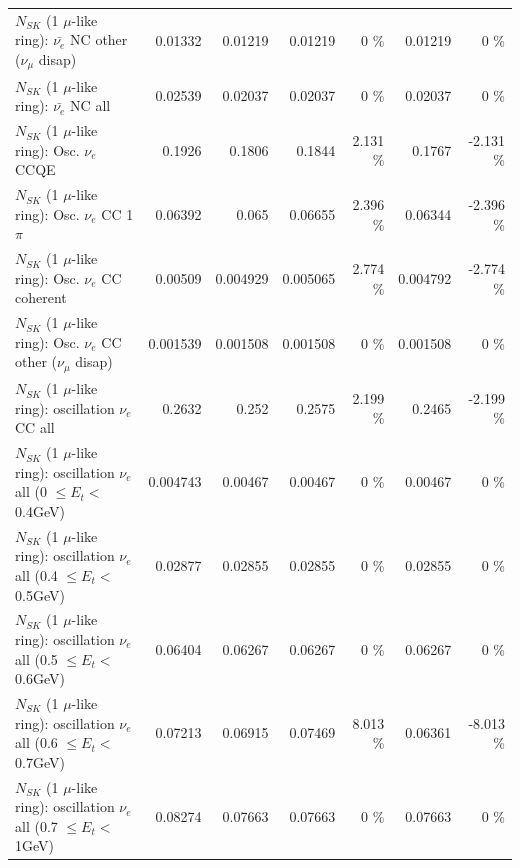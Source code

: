 \begin{table}
\begin{tabular}{| l | r | r | r  r | r  r |}
          $N_{SK}$ (1 $\mu$-like ring): $\bar{\nu_e}$ NC other ($\nu_\mu$ disap) &         0.01332 &         0.01219 &         0.01219 &        0 \%  &         0.01219 &        0 \%  \\ 
                            $N_{SK}$ (1 $\mu$-like ring): $\bar{\nu_{e}}$ NC all &         0.02539 &         0.02037 &         0.02037 &        0 \%  &         0.02037 &        0 \%  \\ 
\hline
\hline
\hline
                                 $N_{SK}$ (1 $\mu$-like ring): Osc. $\nu_e$ CCQE &          0.1926 &          0.1806 &          0.1844 &    2.131 \%  &          0.1767 &   -2.131 \%  \\ 
                            $N_{SK}$ (1 $\mu$-like ring): Osc. $\nu_e$ CC 1$\pi$ &         0.06392 &           0.065 &         0.06655 &    2.396 \%  &         0.06344 &   -2.396 \%  \\ 
                          $N_{SK}$ (1 $\mu$-like ring): Osc. $\nu_e$ CC coherent &         0.00509 &        0.004929 &        0.005065 &    2.774 \%  &        0.004792 &   -2.774 \%  \\ 
           $N_{SK}$ (1 $\mu$-like ring): Osc. $\nu_e$ CC other ($\nu_\mu$ disap) &        0.001539 &        0.001508 &        0.001508 &        0 \%  &        0.001508 &        0 \%  \\ 
                        $N_{SK}$ (1 $\mu$-like ring): oscillation $\nu_e$ CC all &          0.2632 &           0.252 &          0.2575 &    2.199 \%  &          0.2465 &   -2.199 \%  \\ 
\hline
$N_{SK}$ (1 $\mu$-like ring): oscillation $\nu_{e}$ all (0 $\leq E_{t} <$ 0.4GeV) &        0.004743 &         0.00467 &         0.00467 &        0 \%  &         0.00467 &        0 \%  \\ 
$N_{SK}$ (1 $\mu$-like ring): oscillation $\nu_{e}$ all (0.4 $\leq E_{t} <$ 0.5GeV) &         0.02877 &         0.02855 &         0.02855 &        0 \%  &         0.02855 &        0 \%  \\ 
$N_{SK}$ (1 $\mu$-like ring): oscillation $\nu_{e}$ all (0.5 $\leq E_{t} <$ 0.6GeV) &         0.06404 &         0.06267 &         0.06267 &        0 \%  &         0.06267 &        0 \%  \\ 
$N_{SK}$ (1 $\mu$-like ring): oscillation $\nu_{e}$ all (0.6 $\leq E_{t} <$ 0.7GeV) &         0.07213 &         0.06915 &         0.07469 &    8.013 \%  &         0.06361 &   -8.013 \%  \\ 
$N_{SK}$ (1 $\mu$-like ring): oscillation $\nu_{e}$ all (0.7 $\leq E_{t} <$ 1GeV) &         0.08274 &         0.07663 &         0.07663 &        0 \%  &         0.07663 &        0 \%  \\ 

\end{tabular}
\end{table}
